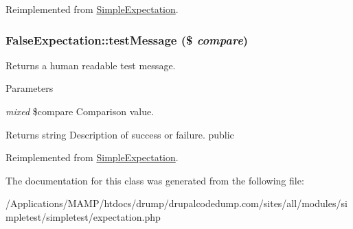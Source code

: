 Reimplemented from \hyperlink{class_simple_expectation_aa2b98f827e7487ebe12cedb9ad39d061}{SimpleExpectation}.\hypertarget{class_false_expectation_aa7d2b7dadaa82d40c41914780804416f}{
\subsubsection[{testMessage}]{\setlength{\rightskip}{0pt plus 5cm}FalseExpectation::testMessage (\$ {\em compare})}}
\label{class_false_expectation_aa7d2b7dadaa82d40c41914780804416f}
Returns a human readable test message. 
\begin{DoxyParams}{Parameters}
\item[{\em mixed}]\$compare Comparison value. \end{DoxyParams}
\begin{DoxyReturn}{Returns}
string Description of success or failure.  public 
\end{DoxyReturn}


Reimplemented from \hyperlink{class_simple_expectation_a15b69edf659c76f6543aa98d8d85b025}{SimpleExpectation}.

The documentation for this class was generated from the following file:\begin{DoxyCompactItemize}
\item 
/Applications/MAMP/htdocs/drump/drupalcodedump.com/sites/all/modules/simpletest/simpletest/expectation.php\end{DoxyCompactItemize}
